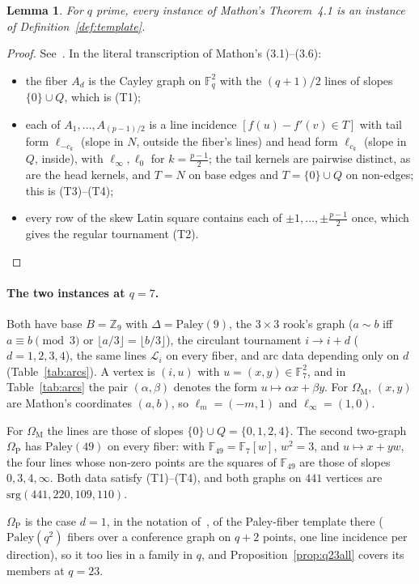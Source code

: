 \documentclass[11pt]{amsart}
\newtheorem{lemma}[theorem]{Lemma}
\theoremstyle{definition}
\theoremstyle{remark}
\newcommand{\F}{\mathbb{F}}
\newcommand{\Z}{\mathbb{Z}}
\newcommand{\srg}{\mathrm{srg}}
\newcommand{\Pal}{\mathrm{Paley}}
\newcommand{\OM}{\Omega_{\mathrm M}}   %
\newcommand{\OP}{\Omega_{\mathrm P}}   %
\begin{document}
\begin{lemma}\label{lem:mathon-instance}
For $q$ prime, every instance of Mathon's Theorem~4.1 is an instance of Definition~\ref{def:template}.
\end{lemma}
\begin{proof}
See~\cite[Section~6.5]{K833}. In the literal transcription of Mathon's (3.1)--(3.6):
\begin{itemize}
\item the fiber $A_d$ is the Cayley graph on $\F_q^2$ with the $(q+1)/2$ lines of slopes $\{0\}\cup Q$, which is (T1);
\item each of $A_1,\dots,A_{(p-1)/2}$ is a line incidence $[f(u)-f'(v)\in T]$ with tail form $\ell_{-c_k}$ (slope in
$N$, outside the fiber's lines) and head form $\ell_{c_k}$ (slope in $Q$, inside), with $\ell_\infty,\ell_0$ for
$k=\frac{p-1}2$; the tail kernels are pairwise distinct, as are the head kernels, and $T=N$ on base edges and
$T=\{0\}\cup Q$ on non-edges; this is (T3)--(T4);
\item every row of the skew Latin square contains each of $\pm1,\dots,\pm\frac{p-1}2$ once, which gives the regular
tournament (T2).\qedhere
\end{itemize}
\end{proof}

\paragraph{The two instances at $q=7$.} Both have base $B=\Z_9$ with $\Delta=\Pal(9)$, the $3\times3$ rook's graph
($a\sim b$ iff $a\equiv b\pmod3$ or $\lfloor a/3\rfloor=\lfloor b/3\rfloor$), the circulant tournament $i\to i+d$
($d=1,2,3,4$), the same lines $\mathcal L_i$ on every fiber, and arc data depending only on $d$ (Table~\ref{tab:arcs}).
A vertex is $(i,u)$ with $u=(x,y)\in\F_7^2$, and in Table~\ref{tab:arcs} the pair $(\alpha,\beta)$ denotes the form
$u\mapsto\alpha x+\beta y$. For $\OM$, $(x,y)$ are Mathon's coordinates $(a,b)$, so $\ell_m=(-m,1)$ and $\ell_\infty=(1,0)$.

For $\OM$ the lines are those of slopes $\{0\}\cup Q=\{0,1,2,4\}$. The second two-graph $\OP$ has $\Pal(49)$ on every
fiber: with $\F_{49}=\F_7[w]$, $w^2=3$, and $u\mapsto x+yw$, the four lines whose non-zero points are the squares of
$\F_{49}$ are those of slopes $0,3,4,\infty$. Both data satisfy (T1)--(T4), and both graphs on $441$ vertices are
$\srg(441,220,109,110)$.

$\OP$ is the case $d=1$, in the notation of~\cite{K833}, of the Paley-fiber template there ($\Pal(q^2)$ fibers over a conference graph on
$q+2$ points, one line incidence per direction), so it too lies in a family in $q$, and Proposition~\ref{prop:q23all}
covers its members at $q=23$.
\end{document}
